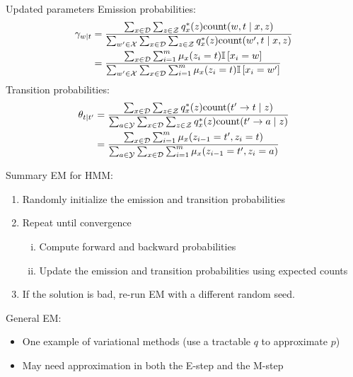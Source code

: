 \documentclass[usenames,dvipsnames,notes,11pt,aspectratio=169]{beamer}
\newcommand{\pdfnote}[1]{}
\begin{document}
\begin{frame}
    {Updated parameters}
    Emission probabilities:
    \begin{align*}
        \gamma_{w\mid t} &= \frac{
            \sum_{x\in\mathcal{D}} \sum_{z\in\mathcal{Z}} q^*_x(z) \text{count}(w,t\mid x,z)
        }{
            \sum_{w'\in\mathcal{X}} \sum_{x\in\mathcal{D}} \sum_{z\in\mathcal{Z}} q^*_x(z) \text{count}(w',t\mid x,z)
        }\\
        &= \frac{
            \sum_{x\in\mathcal{D}} \sum_{i=1}^m \mu_x(z_i=t) \mathbb{I}\left[ x_i=w \right]
        }{
            \sum_{w'\in\mathcal{X}} \sum_{x\in\mathcal{D}} \sum_{i=1}^m \mu_x(z_i=t) \mathbb{I}\left[ x_i=w' \right]
        }
    \end{align*}
    Transition probabilities:
    \begin{align*}
        \theta_{t\mid t'} &= \frac{
            \sum_{x\in\mathcal{D}} \sum_{z\in\mathcal{Z}} q^*_x(z) \text{count}(t'\rightarrow t\mid z)
        }{
            \sum_{a\in\mathcal{Y}} \sum_{x\in\mathcal{D}} \sum_{z\in\mathcal{Z}} q^*_x(z) \text{count}(t'\rightarrow a\mid z)
        }\\
        &= \frac{
            \sum_{x\in\mathcal{D}}\sum_{i=1}^m \mu_x(z_{i-1}=t',z_i=t)
        }{
            \sum_{a\in\mathcal{Y}} \sum_{x\in\mathcal{D}}\sum_{i=1}^m \mu_x(z_{i-1}=t',z_i=a)
        }
    \end{align*}
\end{frame}

\begin{frame}
    {Summary}
    EM for HMM:\\
    \begin{enumerate}
        \item Randomly initialize the emission and transition probabilities
        \item Repeat until convergence
            \begin{enumerate}[(i)]
                \item Compute forward and backward probabilities
                \item Update the emission and transition probabilities using expected counts
            \end{enumerate}
        \item If the solution is bad, re-run EM with a different random seed.
    \end{enumerate}

    General EM:\\
    \begin{itemize}
        \item One example of variational methods (use a tractable $q$ to approximate $p$)
        \item May need approximation in both the E-step and the M-step
    \end{itemize}
    \pdfnote{
        Useful in probabilistic models and Bayesian methods
    }
\end{frame}
\end{document}
